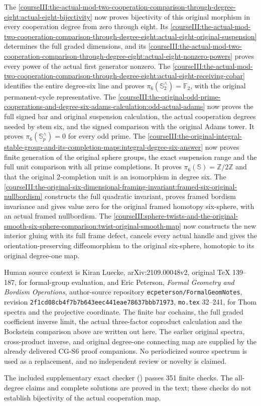 The \cref{courseIII:the-actual-mod-two-cooperation-comparison-through-degree-eight:actual-eight-bijectivity} now proves bijectivity of this original morphism in every cooperation degree from zero through eight. Its \cref{courseIII:the-actual-mod-two-cooperation-comparison-through-degree-eight:actual-eight-original-suspension} determines the full graded dimensions, and its \cref{courseIII:the-actual-mod-two-cooperation-comparison-through-degree-eight:actual-eight-nonzero-powers} proves every power of the actual first generator nonzero. The \cref{courseIII:the-actual-mod-two-cooperation-comparison-through-degree-eight:actual-eight-receiving-cobar} identifies the entire degree-six line and proves \(\pi_6(\mathbb S^{\wedge}_2)=\mathbb F_2\), with the original permanent-cycle representative. The \cref{courseIII:the-original-odd-prime-cooperations-and-degree-six-adams-calculation:odd-actual-adams} now proves the full signed bar and original suspension calculation, the actual cooperation degrees needed by stem six, and the signed comparison with the original Adams tower. It proves \(\pi_6(\mathbb S^{\wedge}_p)=0\) for every odd prime. The \cref{courseIII:the-original-integral-stable-group-and-its-completion-maps:integral-degree-six-answer} now proves finite generation of the original sphere groups, the exact suspension range and the full unit comparison with all prime completions. It proves \(\pi_6(\mathbb S)=\mathbb Z/2\mathbb Z\) and that the original 2-completion unit is an isomorphism in degree six. The \cref{courseIII:the-original-six-dimensional-framing-invariant:framed-six-original-nullbordism} constructs the full quadratic invariant, proves framed bordism invariance and gives value zero for the original framed homotopy six-sphere, with an actual framed nullbordism. The \cref{courseIII:sphere-twists-and-the-original-smooth-six-sphere-comparison:twist-original-smooth-map} now constructs the new interior gluing with its full frame defect, cancels every actual handle and gives the orientation-preserving diffeomorphism to the original six-sphere, homotopic to its original degree-one map.

Human source context is Kiran Luecke, arXiv:2109.00048v2, original TeX 139--187, for formal-group evaluation, and Eric Peterson, \emph{Formal Geometry and Bordism Operations}, author-source repository \texttt{ecpeterson/FormalGeomNotes}, revision \texttt{2f1cd08cb4f7b7b643eec441eae78637bbb71973}, \texttt{mo.tex} 32--241, for Thom spectra and the projective coordinate. The finite bar cochains, the full graded coefficient inverse limit, the actual three-factor coproduct calculation and the Bockstein comparison above are written out here. The earlier original spectra, cross-product inverse, and original degree-one connecting map are supplied by the already delivered CG-S6 proof companions. No periodicized source spectrum is used as a replacement, and no independent review or novelty is claimed.

The included supplementary exact checker () passes 351 finite checks. The all-degree claims and complete solutions are proved in the text; these checks do not establish bijectivity of the actual cooperation map.
